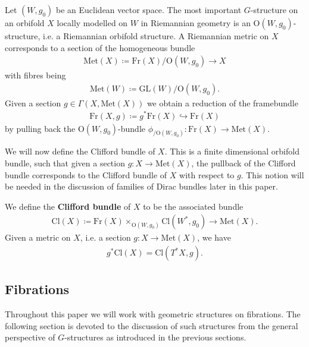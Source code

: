 \documentclass[psamsfonts]{amsart}
\theoremstyle{plain}
\theoremstyle{definition}{
\newtheorem{defi}{Definition}[section]
\newtheorem{ass}{Assumption}
\newtheorem*{nota}{Notation}}
\theoremstyle{remark}{
\newtheorem{rem}{Remark}
\newtheorem{ex}{Example}}
\theoremstyle{plain}{
\newtheorem{thm}{Theorem}[section]
\newtheorem{lem}{Lemma}[section]
\newtheorem{cor}{Corollary}[section]
\newtheorem{prop}{Proposition}[section]
\newtheorem{con}{Conjecture}[section]}
\newcommand{\m}[1]{{\mathrm{#1}}}
\begin{document}
\begin{ex}
Let $(W,g_0)$ be an Euclidean vector space. The most important $G$-structure on an orbifold $X$ locally modelled on $W$ in Riemannian geometry is an $\m{O}(W,g_0)$-structure, i.e. a Riemannian orbifold structure. A Riemannian metric on $X$ corresponds to a section of the homogeneous bundle 
\begin{align*}
    \m{Met}(X)\coloneqq \m{Fr}(X)/\m{O}(W,g_0)\rightarrow X
\end{align*}
with fibres being 
\begin{align*}
    \m{Met}(W)\coloneqq \m{GL}(W)/\m{O}(W,g_0).
\end{align*}
Given a section $g\in \Gamma(X,\m{Met}(X))$ we obtain a reduction of the framebundle 
\begin{align*}
    \m{Fr}(X,g)\coloneqq g^*\m{Fr}(X)\hookrightarrow \m{Fr}(X)
\end{align*}
by pulling back the $\m{O}(W,g_0)$-bundle $\phi_{/\m{O}(W,g_0)}\colon \m{Fr}(X)\rightarrow \m{Met}(X)$.
\end{ex}

We will now define the Clifford bundle of $X$. This is a finite dimensional orbifold bundle, such that given a section $g\colon X\rightarrow \m{Met}(X)$, the pullback of the Clifford bundle corresponds to the Clifford bundle of $X$ with respect to $g$. This notion will be needed in the discussion of families of Dirac bundles later in this paper.

\begin{defi}
    We define the \textbf{Clifford bundle} of $X$ to be the associated bundle 
    \begin{align*}
        \m{Cl}(X)\coloneqq \m{Fr}(X)\times_{\m{O}(W,g_0)}\m{Cl}(W^*,g_0)\rightarrow \m{Met}(X).
    \end{align*}
    Given a metric on $X$, i.e. a section $g\colon X\rightarrow \m{Met}(X)$, we have
    \begin{align*}
        g^*\m{Cl}(X)=\m{Cl}(T^*X,g).
    \end{align*}
\end{defi}




\subsection{Fibrations}
\label{Fibrations}
Throughout this paper we will work with geometric structures on fibrations. The following section is devoted to the discussion of such structures from the general perspective of $G$-structures as introduced in the previous sections.\\
\end{document}
